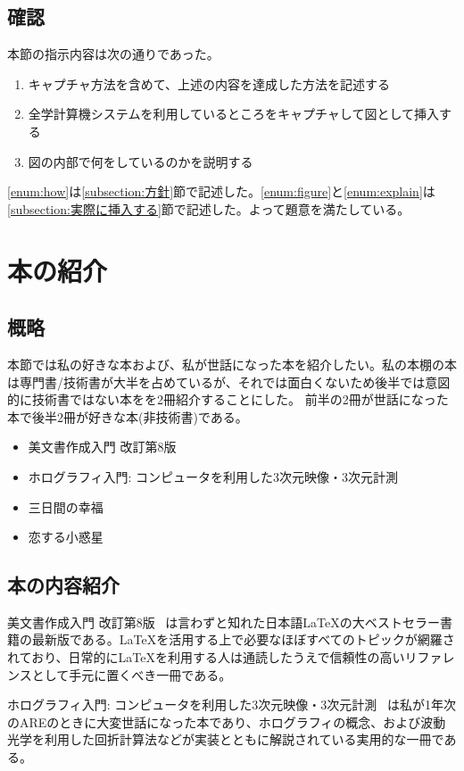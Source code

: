 \documentclass[dvipdfmx,12pt,a4j]{jarticle}
\begin{document}
\subsection{確認}
本節の指示内容は次の通りであった。
\begin{enumerate}
  \item キャプチャ方法を含めて、上述の内容を達成した方法を記述する \label{enum:how}
  \item 全学計算機システムを利用しているところをキャプチャして図として挿入する\label{enum:figure}
  \item 図の内部で何をしているのかを説明する\label{enum:explain}
\end{enumerate}
\ref{enum:how}は\ref{subsection:方針}節で記述した。\ref{enum:figure}と\ref{enum:explain}は\ref{subsection:実際に挿入する}節で記述した。よって題意を満たしている。
\section{本の紹介}
\subsection{概略}
本節では私の好きな本および、私が世話になった本を紹介したい。私の本棚の本は専門書/技術書が大半を占めているが、それでは面白くないため後半では意図的に技術書ではない本をを2冊紹介することにした。
前半の2冊が世話になった本で後半2冊が好きな本(非技術書)である。
\begin{itemize}
  \item \LaTeXe 美文書作成入門 改訂第8版 ~\cite{bibunsho}
  \item ホログラフィ入門: コンピュータを利用した3次元映像・3次元計測~\cite{holo-nyumon} 
  \item 三日間の幸福~\cite{koufuku}
  \item 恋する小惑星~\cite{koiasu}
\end{itemize}

\subsection{本の内容紹介}
\LaTeXe 美文書作成入門 改訂第8版 ~\cite{bibunsho}は言わずと知れた日本語\LaTeX の大ベストセラー書籍の最新版である。\LaTeX を活用する上で必要なほぼすべてのトピックが網羅されており、日常的に\LaTeX を利用する人は通読したうえで信頼性の高いリファレンスとして手元に置くべき一冊である。

ホログラフィ入門: コンピュータを利用した3次元映像・3次元計測~\cite{holo-nyumon} は私が1年次のAREのときに大変世話になった本であり、ホログラフィの概念、および波動光学を利用した回折計算法などが実装とともに解説されている実用的な一冊である。
\end{document}
